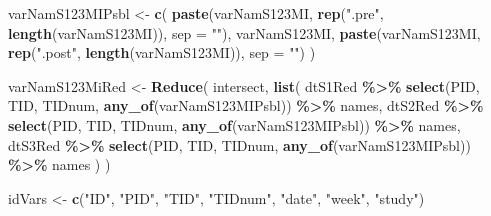 \documentclass[
]{article}
\newenvironment{Shaded}{\begin{snugshade}}{\end{snugshade}}
\newcommand{\AttributeTok}[1]{\textcolor[rgb]{0.13,0.29,0.53}{#1}}
\newcommand{\FunctionTok}[1]{\textcolor[rgb]{0.13,0.29,0.53}{\textbf{#1}}}
\newcommand{\NormalTok}[1]{#1}
\newcommand{\OtherTok}[1]{\textcolor[rgb]{0.56,0.35,0.01}{#1}}
\newcommand{\SpecialCharTok}[1]{\textcolor[rgb]{0.81,0.36,0.00}{\textbf{#1}}}
\newcommand{\StringTok}[1]{\textcolor[rgb]{0.31,0.60,0.02}{#1}}
\begin{document}
\begin{Shaded}
\begin{Highlighting}[]
\NormalTok{varNamS123MIPsbl }\OtherTok{\textless{}{-}} \FunctionTok{c}\NormalTok{(}
  \FunctionTok{paste}\NormalTok{(varNamS123MI, }\FunctionTok{rep}\NormalTok{(}\StringTok{".pre"}\NormalTok{, }\FunctionTok{length}\NormalTok{(varNamS123MI)), }\AttributeTok{sep =} \StringTok{""}\NormalTok{),}
\NormalTok{  varNamS123MI,}
  \FunctionTok{paste}\NormalTok{(varNamS123MI, }\FunctionTok{rep}\NormalTok{(}\StringTok{".post"}\NormalTok{, }\FunctionTok{length}\NormalTok{(varNamS123MI)), }\AttributeTok{sep =} \StringTok{""}\NormalTok{)}
\NormalTok{)}

\NormalTok{varNamS123MiRed }\OtherTok{\textless{}{-}} \FunctionTok{Reduce}\NormalTok{(}
\NormalTok{  intersect,}
  \FunctionTok{list}\NormalTok{(}
\NormalTok{    dtS1Red }\SpecialCharTok{\%\textgreater{}\%} \FunctionTok{select}\NormalTok{(PID, TID, TIDnum, }\FunctionTok{any\_of}\NormalTok{(varNamS123MIPsbl)) }\SpecialCharTok{\%\textgreater{}\%}\NormalTok{ names,}
\NormalTok{    dtS2Red }\SpecialCharTok{\%\textgreater{}\%} \FunctionTok{select}\NormalTok{(PID, TID, TIDnum, }\FunctionTok{any\_of}\NormalTok{(varNamS123MIPsbl)) }\SpecialCharTok{\%\textgreater{}\%}\NormalTok{ names,}
\NormalTok{    dtS3Red }\SpecialCharTok{\%\textgreater{}\%} \FunctionTok{select}\NormalTok{(PID, TID, TIDnum, }\FunctionTok{any\_of}\NormalTok{(varNamS123MIPsbl)) }\SpecialCharTok{\%\textgreater{}\%}\NormalTok{ names}
\NormalTok{  )}
\NormalTok{)}

\NormalTok{idVars }\OtherTok{\textless{}{-}} \FunctionTok{c}\NormalTok{(}\StringTok{"ID"}\NormalTok{, }\StringTok{"PID"}\NormalTok{, }\StringTok{"TID"}\NormalTok{, }\StringTok{"TIDnum"}\NormalTok{, }\StringTok{"date"}\NormalTok{, }\StringTok{"week"}\NormalTok{, }\StringTok{"study"}\NormalTok{)}
\end{Highlighting}
\end{Shaded}
\end{document}
